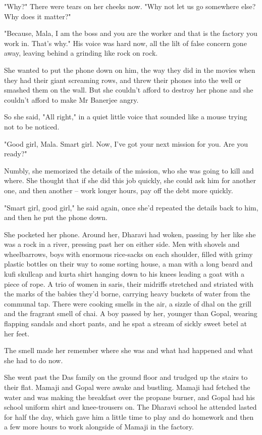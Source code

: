 "Why?" There were tears on her cheeks now. "Why not let us go
somewhere else? Why does it matter?"

"Because, Mala, I am the boss and you are the worker and that is
the factory you work in. That's why." His voice was hard now, all
the lilt of false concern gone away, leaving behind a grinding like
rock on rock.

She wanted to put the phone down on him, the way they did in the
movies when they had their giant screaming rows, and threw their
phones into the well or smashed them on the wall. But she couldn't
afford to destroy her phone and she couldn't afford to make Mr
Banerjee angry.

So she said, "All right," in a quiet little voice that sounded like
a mouse trying not to be noticed.

"Good girl, Mala. Smart girl. Now, I've got your next mission for
you. Are you ready?"

Numbly, she memorized the details of the mission, who she was going
to kill and where. She thought that if she did this job quickly,
she could ask him for another one, and then another -- work longer
hours, pay off the debt more quickly.

"Smart girl, good girl," he said again, once she'd repeated the
details back to him, and then he put the phone down.

She pocketed her phone. Around her, Dharavi had woken, passing by
her like she was a rock in a river, pressing past her on either
side. Men with shovels and wheelbarrows, boys with enormous
rice-sacks on each shoulder, filled with grimy plastic bottles on
their way to some sorting house, a man with a long beard and kufi
skullcap and kurta shirt hanging down to his knees leading a goat
with a piece of rope. A trio of women in saris, their midriffs
stretched and striated with the marks of the babies they'd borne,
carrying heavy buckets of water from the communal tap. There were
cooking smells in the air, a sizzle of dhal on the grill and the
fragrant smell of chai. A boy passed by her, younger than Gopal,
wearing flapping sandals and short pants, and he spat a stream of
sickly sweet betel at her feet.

The smell made her remember where she was and what had happened and
what she had to do now.

She went past the Das family on the ground floor and trudged up the
stairs to their flat. Mamaji and Gopal were awake and bustling.
Mamaji had fetched the water and was making the breakfast over the
propane burner, and Gopal had his school uniform shirt and
knee-trousers on. The Dharavi school he attended lasted for half
the day, which gave him a little time to play and do homework and
then a few more hours to work alongside of Mamaji in the factory.


